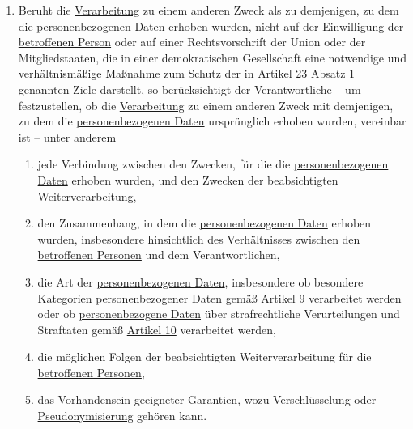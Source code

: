 \begin{enumerate}
  \item Beruht die \hyperref[itm:04-2]{Verarbeitung} zu einem anderen Zweck als zu demjenigen, zu dem die \hyperref[itm:04-1]{personenbezogenen Daten} erhoben
   wurden, nicht auf der Einwilligung der \hyperref[itm:04-1]{betroffenen Person} oder auf einer Rechtsvorschrift der Union oder der
   Mitgliedstaaten, die in einer demokratischen Gesellschaft eine notwendige und verhältnismäßige Maßnahme zum Schutz
   der in \hyperref[itm:23-1]{Artikel 23 Absatz 1} genannten Ziele darstellt, so berücksichtigt der Verantwortliche --
   um festzustellen, ob die \hyperref[itm:04-2]{Verarbeitung} zu einem anderen Zweck mit demjenigen, zu dem die \hyperref[itm:04-1]{personenbezogenen Daten}
   ursprünglich erhoben wurden, vereinbar ist -- unter anderem
  \label{itm:06-4}

  \begin{enumerate}
  
    \item jede Verbindung zwischen den Zwecken, für die die \hyperref[itm:04-1]{personenbezogenen Daten} erhoben wurden, und den Zwecken der
     beabsichtigten Weiterverarbeitung,
    \label{itm:06-4a}

    \item den Zusammenhang, in dem die \hyperref[itm:04-1]{personenbezogenen Daten} erhoben wurden, insbesondere hinsichtlich des
     Verhältnisses zwischen den \hyperref[itm:04-1]{betroffenen Personen} und dem Verantwortlichen,
    \label{itm:06-4b}

    \item die Art der \hyperref[itm:04-1]{personenbezogenen Daten}, insbesondere ob besondere Kategorien \hyperref[itm:04-1]{personenbezogener Daten} gemäß
     \hyperref[ch:9]{Artikel 9} verarbeitet werden oder ob \hyperref[itm:04-1]{personenbezogene Daten} über strafrechtliche Verurteilungen
      und Straftaten gemäß \hyperref[ch:10]{Artikel 10} verarbeitet werden,
    \label{itm:06-4c}

    \item die möglichen Folgen der beabsichtigten Weiterverarbeitung für die \hyperref[itm:04-1]{betroffenen Personen},
    \label{itm:06-4d}

    \item das Vorhandensein geeigneter Garantien, wozu Verschlüsselung oder \hyperref[itm:04-5]{Pseudonymisierung} gehören kann.
    \label{itm:06-4e}

  \end{enumerate}

\end{enumerate}


